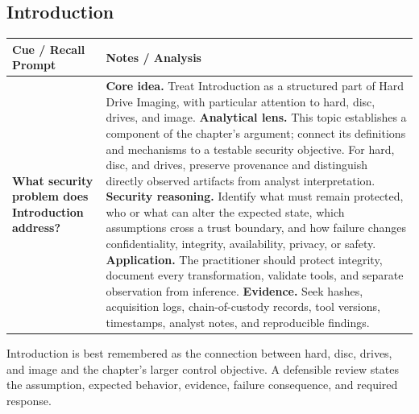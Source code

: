 \documentclass[11pt]{article}
\newcommand{\CornellHeader}{%
\rowcolor{Navy}\color{white}\bfseries Cue / Recall Prompt & \color{white}\bfseries Notes / Analysis\\\hline}
\newcommand{\CornellRow}[2]{%
\cellcolor{CueGray}\RaggedRight\textbf{#1} & \RaggedRight #2\\\hline}
\begin{document}
\subsection*{Introduction}
\begin{longtable}{>{\RaggedRight\arraybackslash}p{}|>{\RaggedRight\arraybackslash}p{}}
\CornellHeader
\CornellRow{What security problem does Introduction address?}{\textbf{Core idea.} Treat Introduction as a structured part of Hard Drive Imaging, with particular attention to hard, disc, drives, and image. \textbf{Analytical lens.} This topic establishes a component of the chapter's argument; connect its definitions and mechanisms to a testable security objective. For hard, disc, and drives, preserve provenance and distinguish directly observed artifacts from analyst interpretation. \textbf{Security reasoning.} Identify what must remain protected, who or what can alter the expected state, which assumptions cross a trust boundary, and how failure changes confidentiality, integrity, availability, privacy, or safety. \textbf{Application.} The practitioner should protect integrity, document every transformation, validate tools, and separate observation from inference. \textbf{Evidence.} Seek hashes, acquisition logs, chain-of-custody records, tool versions, timestamps, analyst notes, and reproducible findings.}
\end{longtable}
\begin{topicsummary}
Introduction is best remembered as the connection between hard, disc, drives, and image and the chapter's larger control objective. A defensible review states the assumption, expected behavior, evidence, failure consequence, and required response.
\end{topicsummary}
\end{document}
